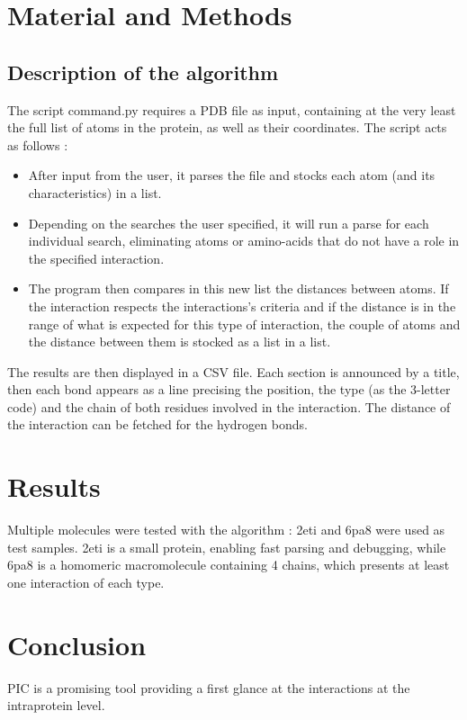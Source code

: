 \documentclass[]{article}
\begin{document}
\section{Material and Methods}
\subsection{Description of the algorithm}
The script command.py requires a PDB file as input, containing at the very least the full list of atoms in the protein, as well as their coordinates.
The script acts as follows :
\begin{itemize}
	\item After input from the user, it parses the file and stocks each atom (and its characteristics) in a list.
	\item Depending on the searches the user specified, it will run a parse for each individual search, eliminating atoms or amino-acids that do not have a role in the specified interaction.
	\item The program then compares in this new list the distances between atoms. If the interaction respects the interactions's criteria and if the distance is in the range of what is expected for this type of interaction, the couple of atoms and the distance between them is stocked as a list in a list.
\end{itemize}

The results are then displayed in a CSV file.
Each section is announced by a title, then each bond appears as a line precising the position, the type (as the 3-letter code) and the chain of both residues involved in the interaction.
The distance of the interaction can be fetched for the hydrogen bonds.

\section{Results}
Multiple molecules were tested with the algorithm : 2eti and 6pa8 were used as test samples. 2eti is a small protein, enabling fast parsing and debugging, while 6pa8 is a homomeric macromolecule containing 4 chains, which presents at least one interaction of each type.

\section{Conclusion}
PIC is a promising tool providing a first glance at the interactions at the intraprotein level.
\end{document}
